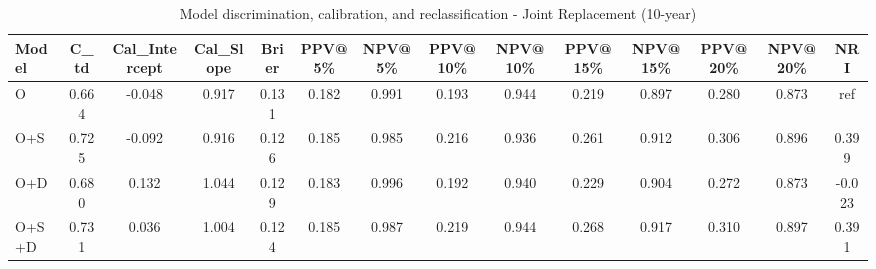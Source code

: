\begin{table}[htbp]
\centering
\small
\caption{Model discrimination, calibration, and reclassification - Joint Replacement (10-year)}
\label{tab:perf_joint_10y}
\begin{tabular}{lccccccccccccc}
\toprule
Model & C\_td & Cal\_Intercept & Cal\_Slope & Brier & PPV@5\% & NPV@5\% & PPV@10\% & NPV@10\% & PPV@15\% & NPV@15\% & PPV@20\% & NPV@20\% & NRI \\
\midrule
O & 0.664 & -0.048 & 0.917 & 0.131 & 0.182 & 0.991 & 0.193 & 0.944 & 0.219 & 0.897 & 0.280 & 0.873 & ref \\
O+S & 0.725 & -0.092 & 0.916 & 0.126 & 0.185 & 0.985 & 0.216 & 0.936 & 0.261 & 0.912 & 0.306 & 0.896 & 0.399 \\
O+D & 0.680 & 0.132 & 1.044 & 0.129 & 0.183 & 0.996 & 0.192 & 0.940 & 0.229 & 0.904 & 0.272 & 0.873 & -0.023 \\
O+S+D & 0.731 & 0.036 & 1.004 & 0.124 & 0.185 & 0.987 & 0.219 & 0.944 & 0.268 & 0.917 & 0.310 & 0.897 & 0.391 \\
\bottomrule
\end{tabular}
\end{table}